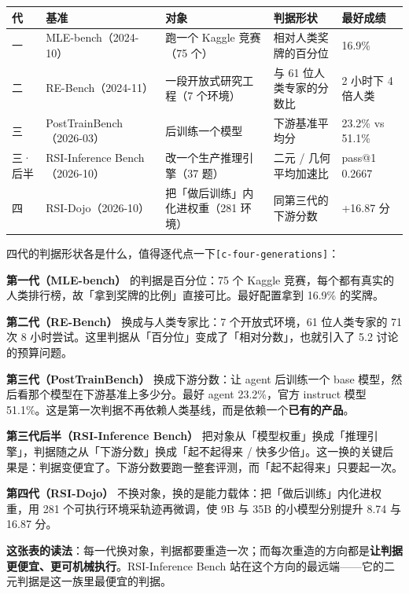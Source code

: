 \begin{table}[t]
\centering
\footnotesize
\setlength{\tabcolsep}{4pt}
\label{tab:4}
\begin{tabularx}{\textwidth}{lXlll}
\toprule
代 & 基准 & 对象 & 判据形状 & 最好成绩 \\
\midrule
一 & MLE-bench（2024-10） & 跑一个 Kaggle 竞赛（75 个） & 相对人类奖牌的百分位 & 16.9\% \\
二 & RE-Bench（2024-11） & 一段开放式研究工程（7 个环境） & 与 61 位人类专家的分数比 & 2 小时下 4 倍人类 \\
三 & PostTrainBench（2026-03） & 后训练一个模型 & 下游基准平均分 & 23.2\% vs 51.1\% \\
三·后半 & RSI-Inference Bench（2026-10） & 改一个生产推理引擎（37 题） & 二元 / 几何平均加速比 & pass@1 0.2667 \\
四 & RSI-Dojo（2026-10） & 把「做后训练」内化进权重（281 环境） & 同第三代的下游分数 & +16.87 分 \\
\bottomrule
\end{tabularx}
\end{table}

四代的判据形状各是什么，值得逐代点一下{\scriptsize\texttt{[c-\hspace{0pt}four-\hspace{0pt}generations]}}：


\textbf{第一代（MLE-bench）} 的判据是百分位：75 个 Kaggle 竞赛，每个都有真实的人类排行榜，故「拿到奖牌的比例」直接可比。最好配置拿到 16.9\% 的奖牌。


\textbf{第二代（RE-Bench）} 换成与人类专家比：7 个开放式环境，61 位人类专家的 71 次 8 小时尝试。这里判据从「百分位」变成了「相对分数」，也就引入了 5.2 讨论的预算问题。


\textbf{第三代（PostTrainBench）} 换成下游分数：让 agent 后训练一个 base 模型，然后看那个模型在下游基准上多少分。最好 agent 23.2\%，官方 instruct 模型 51.1\%。这是第一次判据不再依赖人类基线，而是依赖一个\textbf{已有的产品}。


\textbf{第三代后半（RSI-Inference Bench）} 把对象从「模型权重」换成「推理引擎」，判据随之从「下游分数」换成「起不起得来 / 快多少倍」。这一换的关键后果是：判据变便宜了。下游分数要跑一整套评测，而「起不起得来」只要起一次。


\textbf{第四代（RSI-Dojo）} 不换对象，换的是能力载体：把「做后训练」内化进权重，用 281 个可执行环境采轨迹再微调，使 9B 与 35B 的小模型分别提升 8.74 与 16.87 分。


\textbf{这张表的读法}：每一代换对象，判据都要重造一次；而每次重造的方向都是\textbf{让判据更便宜、更可机械执行}。RSI-Inference Bench 站在这个方向的最远端——它的二元判据是这一族里最便宜的判据。


